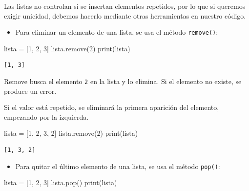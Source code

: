 \documentclass[
  letterpaper,
  DIV=11,
  numbers=noendperiod]{scrreprt}
\newenvironment{Shaded}{\begin{snugshade}}{\end{snugshade}}
\newcommand{\BuiltInTok}[1]{\textcolor[rgb]{0.00,0.23,0.31}{#1}}
\newcommand{\DecValTok}[1]{\textcolor[rgb]{0.68,0.00,0.00}{#1}}
\newcommand{\NormalTok}[1]{\textcolor[rgb]{0.00,0.23,0.31}{#1}}
\newcommand{\OperatorTok}[1]{\textcolor[rgb]{0.37,0.37,0.37}{#1}}
\providecommand{\tightlist}{%
  \setlength{\itemsep}{0pt}\setlength{\parskip}{0pt}}\usepackage{longtable,booktabs,array}
\begin{document}
Las listas no controlan si se insertan elementos repetidos, por lo que
si queremos exigir unicidad, debemos hacerlo mediante otras herramientas
en nuestro código.

\begin{itemize}
\tightlist
\item
  Para eliminar un elemento de una lista, se usa el método
  \texttt{remove()}:
\end{itemize}

\begin{Shaded}
\begin{Highlighting}[]
\NormalTok{lista }\OperatorTok{=}\NormalTok{ [}\DecValTok{1}\NormalTok{, }\DecValTok{2}\NormalTok{, }\DecValTok{3}\NormalTok{]}
\NormalTok{lista.remove(}\DecValTok{2}\NormalTok{)}
\BuiltInTok{print}\NormalTok{(lista)}
\end{Highlighting}
\end{Shaded}

\begin{verbatim}
[1, 3]
\end{verbatim}

Remove busca el elemento \texttt{2} en la lista y lo elimina. Si el
elemento no existe, se produce un error.

Si el valor está repetido, se eliminará la primera aparición del
elemento, empezando por la izquierda.

\begin{Shaded}
\begin{Highlighting}[]
\NormalTok{lista }\OperatorTok{=}\NormalTok{ [}\DecValTok{1}\NormalTok{, }\DecValTok{2}\NormalTok{, }\DecValTok{3}\NormalTok{, }\DecValTok{2}\NormalTok{]}
\NormalTok{lista.remove(}\DecValTok{2}\NormalTok{)}
\BuiltInTok{print}\NormalTok{(lista)}
\end{Highlighting}
\end{Shaded}

\begin{verbatim}
[1, 3, 2]
\end{verbatim}

\begin{itemize}
\tightlist
\item
  Para quitar el último elemento de una lista, se usa el método
  \texttt{pop()}:
\end{itemize}

\begin{Shaded}
\begin{Highlighting}[]
\NormalTok{lista }\OperatorTok{=}\NormalTok{ [}\DecValTok{1}\NormalTok{, }\DecValTok{2}\NormalTok{, }\DecValTok{3}\NormalTok{]}
\NormalTok{lista.pop()}
\BuiltInTok{print}\NormalTok{(lista)}
\end{Highlighting}
\end{Shaded}
\end{document}
